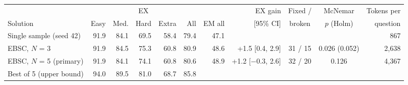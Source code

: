 \begin{tabular}{@{}l rrrr rr r c c r@{}}
\toprule
 & \multicolumn{5}{c}{EX} & & EX gain & Fixed / & McNemar & Tokens per \\
\cmidrule(lr){2-6}
Solution & Easy & Med. & Hard & Extra & All & EM all & [95\% CI] & broken & $p$ (Holm) & question \\
\midrule
Single sample (seed 42) & 91.9 & 84.1 & 69.5 & 58.4 & 79.4 & 47.1 &  &  &  & 867 \\
EBSC, $N$ = 3 & 91.9 & 84.5 & 75.3 & 60.8 & 80.9 & 48.6 & +1.5 [0.4, 2.9] & 31 / 15 & 0.026 (0.052) & 2,638 \\
EBSC, $N$ = 5 (primary) & 91.9 & 84.1 & 74.1 & 60.8 & 80.6 & 48.9 & +1.2 [$-$0.3, 2.6] & 32 / 20 & 0.126 & 4,367 \\
\midrule
Best of 5 (upper bound) & 94.0 & 89.5 & 81.0 & 68.7 & 85.8 &  &  &  &  &  \\
\bottomrule
\end{tabular}
